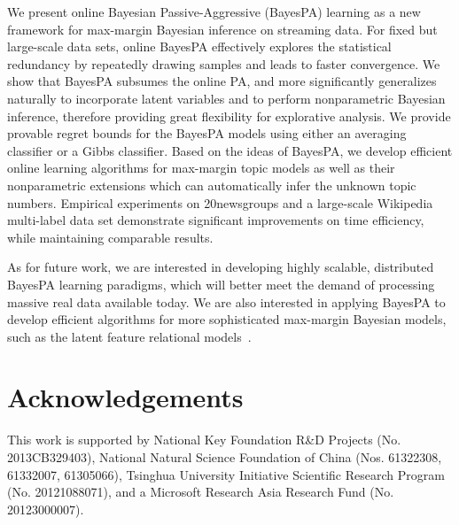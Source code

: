 \documentclass[twoside,11pt]{article}
\begin{document}
We present online Bayesian Passive-Aggressive (BayesPA) learning as a new framework for max-margin Bayesian inference on streaming data. For fixed but large-scale data sets, online BayesPA effectively explores the statistical redundancy by repeatedly drawing samples and leads to faster convergence. We show that BayesPA subsumes the online PA, and more significantly generalizes naturally to incorporate latent variables and to perform nonparametric Bayesian inference, therefore providing great flexibility for explorative analysis. We provide provable regret bounds for the BayesPA models using either an averaging classifier or a Gibbs classifier. Based on the ideas of BayesPA, we develop efficient online learning algorithms for max-margin topic models as well as their nonparametric extensions which can automatically infer the unknown topic numbers. Empirical experiments on 20newsgroups and a large-scale Wikipedia multi-label data set demonstrate significant improvements on time efficiency, while maintaining comparable results.

As for future work, we are interested in developing highly scalable, distributed \citep{broderick2013streaming} BayesPA learning paradigms, which will better meet the demand of processing massive real data available today. We are also interested in applying BayesPA to develop efficient algorithms for more sophisticated max-margin Bayesian models, such as the latent feature relational models~\citep{zhu2012maxlink}.


\section*{Acknowledgements}

This work is supported by National Key Foundation R\&D Projects (No. 2013CB329403), National Natural Science Foundation of China (Nos. 61322308, 61332007, 61305066), Tsinghua University Initiative Scientific Research Program (No. 20121088071), and a Microsoft Research Asia Research Fund (No. 20123000007).
\end{document}

